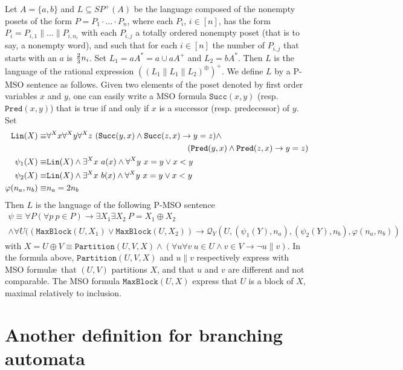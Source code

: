 \documentclass{CSML}
\begin{document}
\begin{exa}
  Let $A=\{a,b\}$ and $L\subseteq SP^+(A)$ be the language composed of the nonempty posets of the form $P=P_1\cdot\dots\cdot P_n$, where each $P_i$, $i\in[n]$, has the form $P_i=P_{i,1}\parallel\dots\parallel P_{i,n_i}$ with each $P_{i,j}$ a totally ordered nonempty poset (that is to say, a nonempty word), and such that for each $i\in[n]$ the number of $P_{i,j}$ that starts with an $a$ is ${2\over 3} n_i$.
  Set $L_1=aA^*=a\cup aA^+$ and $L_2=bA^*$.
  Then $L$ is the language of the rational expression $((L_1\parallel L_1\parallel L_2)^\oplus)^+$.
  We define $L$ by a P-MSO sentence as follows.
  Given two elements of the poset denoted by first order variables $x$ and $y$, one can easily write a MSO formula $\texttt{Succ}(x,y)$ (resp. $\texttt{Pred}(x,y)$) that is true if and only if $x$ is a successor (resp. predecessor) of $y$.
  Set
  \begin{align*}
    \texttt{Lin}(X)\equiv& \forall^X x\forall^X y\forall^X z\ (\texttt{Succ}(y,x)\land \texttt{Succ}(z,x)\rightarrow y=z)\land\\&\hskip6cm (\texttt{Pred}(y,x)\land \texttt{Pred}(z,x)\rightarrow y=z)\\
    \psi_1(X)\equiv& \texttt{Lin}(X)\land\exists^X x\ a(x)\land\forall^X y\ x=y\lor x<y\\
    \psi_2(X)\equiv& \texttt{Lin}(X)\land\exists^X x\ b(x)\land\forall^X y\ x=y\lor x<y\\
    \varphi(n_a,n_b)\equiv& n_a=2n_b
    \end{align*}
    Then $L$ is the language of the following P-MSO sentence
    \begin{multline*}
    \psi\equiv \forall P (\forall p\ p\in P)\rightarrow \exists X_1\exists X_2\ P=X_1\oplus X_2\ \\ \land\forall U ((\texttt{MaxBlock}(U,X_1)\lor\texttt{MaxBlock}(U,X_2))\rightarrow \mathcal{Q}_Y(U,(\psi_1(Y),n_a),(\psi_2(Y),n_b),\varphi(n_a,n_b))
  \end{multline*}
  with
  $
    X=U\oplus V\equiv\texttt{Partition}(U,V,X)\land(\forall u\forall v\ u\in U\land v\in V\rightarrow\lnot u\parallel v)
  $.
  In the formula above, $\texttt{Partition}(U,V,X)$ and $u\parallel v$ respectively express with MSO formul{\ae}\ that $(U,V)$ partitions $X$, and that $u$ and $v$ are different and not comparable. The MSO formula $\texttt{MaxBlock}(U,X)$ express that $U$ is a block of $X$, maximal relatively to inclusion.
\end{exa}

\section{Another definition for branching automata}
\label{sec:PBranching}
\end{document}

